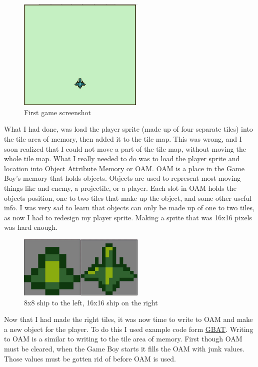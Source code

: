 \documentclass{article}
\begin{document}
\begin{figure}[htp]
    \centering
    \includegraphics[width=6cm]{images/gettingShipOnScreen.JPG}
    \caption{First game screenshot}
    \label{What was on screen}
\end{figure}

What I had done, was load the player sprite (made up of four separate tiles) into the tile area of memory, then added it to the tile map. This was wrong, and I soon realized that I could not move a part of the tile map, without moving the whole tile map. What I really needed to do was to load the player sprite and location into Object Attribute Memory or OAM. OAM is a place in the Game Boy's memory that holds objects. Objects are used to represent most moving things like and enemy, a projectile, or a player. Each slot in OAM holds the objects position, one to two tiles that make up the object, and some other useful info. I was very sad to learn that objects can only be made up of one to two tiles, as now I had to redesign my player sprite. Making a sprite that was 16x16 pixels was hard enough. 

\begin{figure}[htp]
    \centering
    \includegraphics[width=6cm]{images/ShipComparasion.JPG}
    \caption{8x8 ship to the left, 16x16 ship on the right}
    \label{Ship comparasion}
\end{figure}

Now that I had made the right tiles, it was now time to write to OAM and make a new object for the player. To do this I used example code form \href{https://gbdev.io/gb-asm-tutorial/part2/objects.html}{GBAT}. Writing to OAM is a similar to writing to the tile area of memory. First though OAM must be cleared, when the Game Boy starts it fills the OAM with junk values. Those values must be gotten rid of before OAM is used. 
\end{document}
